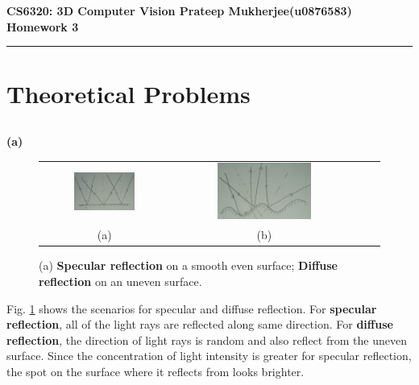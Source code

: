 \documentclass[11pt]{article}
\begin{document}
\thispagestyle{empty}
{\large{\bf CS6320: 3D Computer Vision \hfill Prateep Mukherjee(u0876583)}}\\

{\LARGE{\bf Homework 3}}
\vspace{0.2\baselineskip}
\hrule


  \vspace{-10pt}
\section{Theoretical Problems}
    \vspace{-10pt}
    
 \subsection{}   
\textbf{(a)} 

\begin{figure}[!hbt]
\centering
\begin{tabular}{cc  cc}
  \includegraphics[width=0.5\textwidth]{IMAG0252.jpg} &
  \includegraphics[width=0.53\textwidth]{IMAG0253.jpg} \\
  (a) & (b) 
 \end{tabular}
 \vspace{-10pt}
 \caption{(a) \textbf{Specular reflection} on a smooth even surface; \textbf{Diffuse reflection} on an uneven surface.}
 \label{fig1}
\end{figure}

Fig. \ref{fig1} shows the scenarios for specular and diffuse reflection. For \textbf{specular  reflection}, all of the light rays are reflected along same direction. For \textbf{diffuse reflection}, the direction of light rays is random and also reflect from the uneven surface. Since the concentration of light intensity is greater for specular reflection, the spot on the surface where it reflects from looks brighter.
\end{document}
